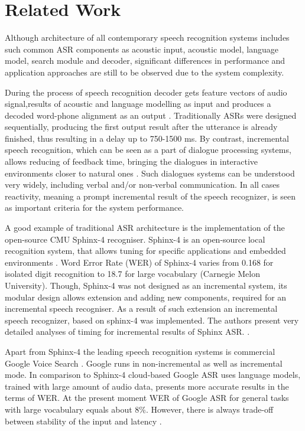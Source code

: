 \chapter {Related Work}
\label{ch:relatedWork}
Although architecture of  all contemporary speech recognition systems includes
such common ASR components as acoustic input, acoustic model, language model,
search module and decoder, significant differences in performance and 
application approaches are still to be observed due to the system complexity. 


During the process of speech recognition decoder gets feature vectors of audio
signal,results of acoustic and language modelling as input and produces
a decoded word-phone alignment as an output \parencite {jurafskymartin2009}.
Traditionally ASRs were designed sequentially, producing the first output result
after the utterance is already finished, thus resulting in a delay up to
750-1500 ms. By contrast, incremental speech recognition, which can be
seen as a part of dialogue processing systems, allows reducing of feedback time,
bringing the dialogues in interactive
environments closer to natural ones \parencite {skantzeschlangen2009}. 
Such dialogues systems can be understood very widely, including verbal and/or
non-verbal communication. In all cases reactivity, meaning a prompt
incremental result of the speech recognizer, is seen as important criteria for
the system performance. 

A good example of  traditional ASR architecture is the implementation of the
open-source CMU Sphinx-4 recogniser. Sphinx-4 is an open-source local
recognition system, that allows tuning for specific applications and embedded
environments \parencite
{Lamereetal2013:Eurospeech}.  Word Error Rate (WER) of Sphinx-4 varies from 0.168 for isolated
digit recognition to 18.7 for large vocabulary (Carnegie Melon University).
Though, Sphinx-4 was not designed as an incremental system, its modular design allows extension and adding new components, required 
for an incremental speech recogniser. As a result of such extension an
incremental speech recognizer, based on sphinx-4 was implemented. The authors present very detailed analyses of timing for
incremental results of Sphinx ASR. \parencite {baumannetal2009:naacl}.

Apart from Sphinx-4 the leading speech recognition systems is commercial
Google Voice Search \parencite{schalkwyk2010}. Google runs in non-incremental as
well as incremental mode. In comparison to Sphinx-4  cloud-based Google ASR uses
language models, trained with  large amount of audio data, presents more
accurate results in the terms of WER. At the present moment WER of Google ASR for general tasks
with large vocabulary equals about 8\%. However, there is always trade-off
between stability of the input and latency \parencite {mcgrawgrauenstein2012}.

